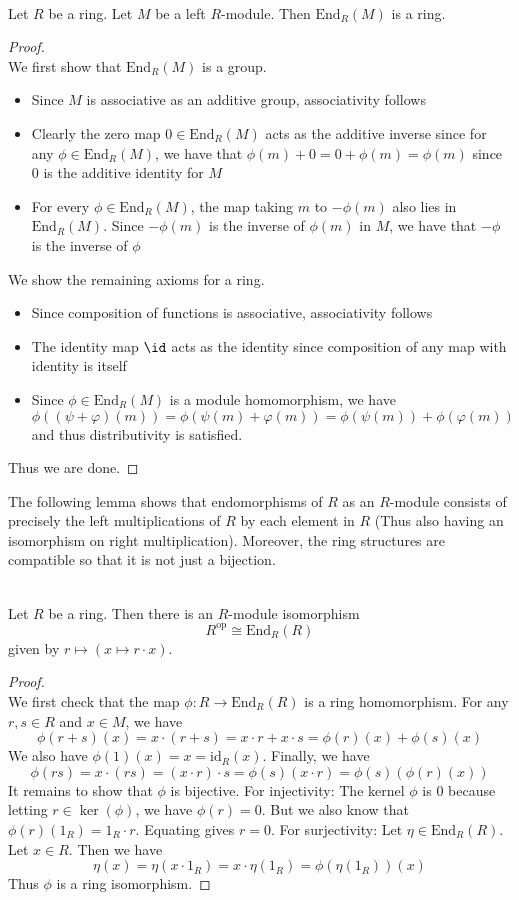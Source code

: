 \documentclass[a4paper]{article}
\begin{document}
\begin{prp}{}{}\\
Let $R$ be a ring. Let $M$ be a left $R$-module. Then $\text{End}_R(M)$ is a ring. 
\begin{proof}\\
We first show that $\text{End}_R(M)$ is a group. 
\begin{itemize}
\item Since $M$ is associative as an additive group, associativity follows
\item Clearly the zero map $0\in\text{End}_R(M)$ acts as the additive inverse since for any $\phi\in\text{End}_R(M)$, we have that $\phi(m)+0=0+\phi(m)=\phi(m)$ since $0$ is the additive identity for $M$
\item For every $\phi\in\text{End}_R(M)$, the map taking $m$ to $-\phi(m)$ also lies in $\text{End}_R(M)$. Since $-\phi(m)$ is the inverse of $\phi(m)$ in $M$, we have that $-\phi$ is the inverse of $\phi$
\end{itemize}
We show the remaining axioms for a ring. 
\begin{itemize}
\item Since composition of functions is associative, associativity follows
\item The identity map $\id$ acts as the identity since composition of any map with identity is itself
\item Since $\phi\in\text{End}_R(M)$ is a module homomorphism, we have $$\phi((\psi+\varphi)(m))=\phi(\psi(m)+\varphi(m))=\phi(\psi(m))+\phi(\varphi(m))$$ and thus distributivity is satisfied. 
\end{itemize}
Thus we are done. 
\end{proof}
\end{prp}

The following lemma shows that endomorphisms of $R$ as an $R$-module consists of precisely the left multiplications of $R$ by each element in $R$ (Thus also having an isomorphism on right multiplication). Moreover, the ring structures are compatible so that it is not just a bijection. 

\begin{prp}{}{}\\
Let $R$ be a ring. Then there is an $R$-module isomorphism $$R^\text{op}\cong\text{End}_R(R)$$ given by $r\mapsto(x\mapsto r\cdot x)$. 
\begin{proof}\\
We first check that the map $\phi:R\to\text{End}_R(R)$ is a ring homomorphism. For any $r,s\in R$ and $x\in M$, we have $$\phi(r+s)(x)=x\cdot (r+s)=x\cdot r+x\cdot s=\phi(r)(x)+\phi(s)(x)$$ We also have $\phi(1)(x)=x=\text{id}_R(x)$. Finally, we have $$\phi(rs)=x\cdot (rs)=(x\cdot r)\cdot s=\phi(s)(x\cdot r)=\phi(s)(\phi(r)(x))$$ It remains to show that $\phi$ is bijective. For injectivity: The kernel $\phi$ is $0$ because letting $r\in\ker(\phi)$, we have $\phi(r)=0$. But we also know that $\phi(r)(1_R)=1_R\cdot r$. Equating gives $r=0$. For surjectivity: Let $\eta\in\text{End}_R(R)$. Let $x\in R$. Then we have $$
\eta(x)=\eta(x\cdot 1_R)=x\cdot\eta(1_R)=\phi(\eta(1_R))(x)$$ Thus $\phi$ is a ring isomorphism. 
\end{proof}
\end{prp}
\end{document}
